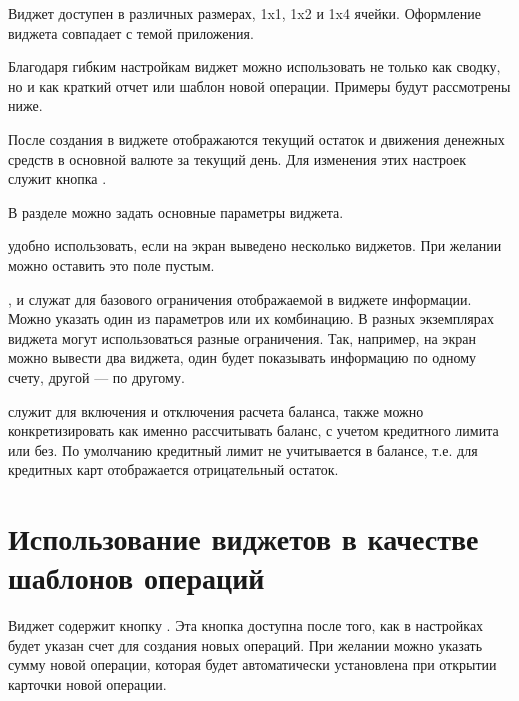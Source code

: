 \documentclass[a4paper,10pt,russian]{sphinxmanual}
\begin{document}

Виджет доступен в различных размерах, 1x1, 1x2 и 1x4 ячейки. Оформление виджета совпадает с темой приложения.

Благодаря гибким настройкам виджет можно использовать не только как сводку, но и как краткий отчет или шаблон
новой операции. Примеры будут рассмотрены ниже.

\noindent{}

\noindent{}

\noindent{}

После создания в виджете отображаются текущий остаток и движения денежных средств в основной валюте за текущий день.
Для изменения этих настроек служит кнопка .

В разделе  можно задать основные параметры виджета.

 удобно использовать, если на экран выведено несколько виджетов. При желании можно оставить это поле
пустым.

,  и  служат для базового ограничения отображаемой в
виджете информации. Можно указать один из параметров или их комбинацию. В разных экземплярах виджета могут использоваться
разные ограничения. Так, например, на экран можно вывести два виджета, один будет показывать информацию по одному счету,
другой — по другому.

  служит для включения и отключения расчета баланса, также можно конкретизировать как именно
рассчитывать баланс, с учетом кредитного лимита или без. По умолчанию кредитный лимит не учитывается в балансе, т.е. для
кредитных карт отображается отрицательный остаток.

\noindent{}

\noindent{}


\section{Использование виджетов в качестве шаблонов операций}
\label{\detokenize{widgets:id3}}
Виджет содержит кнопку . Эта кнопка доступна после того, как в настройках будет указан счет для
создания новых операций. При желании можно указать сумму новой операции, которая будет автоматически установлена
при открытии карточки новой операции.
\end{document}
